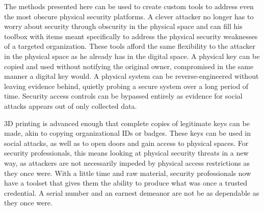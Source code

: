 \documentclass{acm_proc_article-sp}
\begin{document}
The methods presented here can be used to create custom tools to address even the most obscure physical security platforms. A clever attacker no longer has to worry about security through obscurity in the physical space and can fill his toolbox with items meant specifically to address the physical security weaknesses of a targeted organization. These tools afford the same flexibility to the attacker in the physical space as he already has in the digital space. A physical key can be copied and used without notifying the original owner, compromised in the same manner a digital key would. A physical system can be reverse-engineered without leaving evidence behind, quietly probing a secure system over a long period of time. Security access controls can be bypassed entirely as evidence for social attacks appears out of only collected data.

3D printing is advanced enough that complete copies of legitimate keys can be made, akin to copying organizational IDs or badges. These keys can be used in social attacks, as well as to open doors and gain access to physical spaces. For security professionals, this means looking at physical security threats in a new way, as attackers are not necessarily impeded by physical access restrictions as they once were. With a little time and raw material, security professionals now have a toolset that gives them the ability to produce what was once a trusted credential. A serial number and an earnest demeanor are not be as dependable as they once were.



\nocite{*}
\balancecolumns
\end{document}
